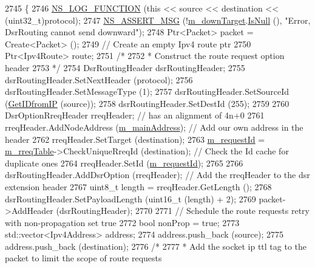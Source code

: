 \begin{DoxyCode}
2745 \{
2746   \hyperlink{log-macros-disabled_8h_a90b90d5bad1f39cb1b64923ea94c0761}{NS\_LOG\_FUNCTION} (\textcolor{keyword}{this} << source << destination << (uint32\_t)protocol);
2747   \hyperlink{assert_8h_aff5ece9066c74e681e74999856f08539}{NS\_ASSERT\_MSG} (!\hyperlink{classns3_1_1dsr_1_1DsrRouting_aa1eb6ea60fdf9ba2cac2079a74ce1ca4}{m\_downTarget}.\hyperlink{classns3_1_1Callback_aa8e27826badbf37f84763f36f70d9b54}{IsNull} (), \textcolor{stringliteral}{"Error, DsrRouting cannot send
       downward"});
2748   Ptr<Packet> packet = Create<Packet> ();
2749   \textcolor{comment}{// Create an empty Ipv4 route ptr}
2750   Ptr<Ipv4Route> route;
2751   \textcolor{comment}{/*}
2752 \textcolor{comment}{   * Construct the route request option header}
2753 \textcolor{comment}{   */}
2754   DsrRoutingHeader dsrRoutingHeader;
2755   dsrRoutingHeader.SetNextHeader (protocol);
2756   dsrRoutingHeader.SetMessageType (1);
2757   dsrRoutingHeader.SetSourceId (\hyperlink{classns3_1_1dsr_1_1DsrRouting_a4593e50d5f36e9b9b013fe0422067c44}{GetIDfromIP} (source));
2758   dsrRoutingHeader.SetDestId (255);
2759 
2760   DsrOptionRreqHeader rreqHeader;                                  \textcolor{comment}{// has an alignment of 4n+0}
2761   rreqHeader.AddNodeAddress (\hyperlink{classns3_1_1dsr_1_1DsrRouting_a73182b5edee2d8460f28855e058fc9a0}{m\_mainAddress});                       \textcolor{comment}{// Add our own address in
       the header}
2762   rreqHeader.SetTarget (destination);
2763   \hyperlink{classns3_1_1dsr_1_1DsrRouting_a4d9ddfed8e907a5885bb5e0f4b41f388}{m\_requestId} = \hyperlink{classns3_1_1dsr_1_1DsrRouting_ae9ec27743735fa2d59cc5190961d1942}{m\_rreqTable}->CheckUniqueRreqId (destination);      \textcolor{comment}{// Check the Id
       cache for duplicate ones}
2764   rreqHeader.SetId (\hyperlink{classns3_1_1dsr_1_1DsrRouting_a4d9ddfed8e907a5885bb5e0f4b41f388}{m\_requestId});
2765 
2766   dsrRoutingHeader.AddDsrOption (rreqHeader);                      \textcolor{comment}{// Add the rreqHeader to the dsr
       extension header}
2767   uint8\_t length = rreqHeader.GetLength ();
2768   dsrRoutingHeader.SetPayloadLength (uint16\_t (length) + 2);
2769   packet->AddHeader (dsrRoutingHeader);
2770 
2771   \textcolor{comment}{// Schedule the route requests retry with non-propagation set true}
2772   \textcolor{keywordtype}{bool} nonProp = \textcolor{keyword}{true};
2773   std::vector<Ipv4Address> address;
2774   address.push\_back (source);
2775   address.push\_back (destination);
2776   \textcolor{comment}{/*}
2777 \textcolor{comment}{   * Add the socket ip ttl tag to the packet to limit the scope of route requests}

\end{DoxyCode}
